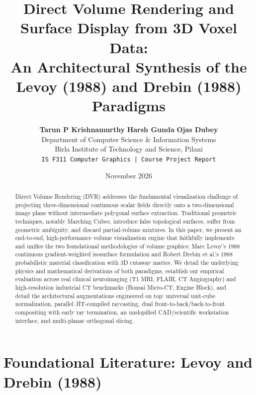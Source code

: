 \documentclass[10pt,twocolumn,a4paper]{article}
\title{\textbf{\Large Direct Volume Rendering and Surface Display from 3D Voxel Data:\\An Architectural Synthesis of the Levoy (1988) and Drebin (1988) Paradigms}}
\author{
    \textbf{Tarun P Krishnamurthy} \quad \textbf{Harsh Gunda} \quad \textbf{Ojas Dubey} \\
    \small Department of Computer Science \& Information Systems \\
    \small Birla Institute of Technology and Science, Pilani \\
    \small \texttt{IS F311 Computer Graphics | Course Project Report}
}
\date{November 2026}
\begin{document}
\maketitle

\begin{abstract}
Direct Volume Rendering (DVR) addresses the fundamental visualization challenge of projecting three-dimensional continuous scalar fields directly onto a two-dimensional image plane without intermediate polygonal surface extraction. Traditional geometric techniques, notably Marching Cubes, introduce false topological surfaces, suffer from geometric ambiguity, and discard partial-volume mixtures. In this paper, we present an end-to-end, high-performance volume visualization engine that faithfully implements and unifies the two foundational methodologies of volume graphics: Marc Levoy's 1988 continuous gradient-weighted isosurface formulation and Robert Drebin et al.'s 1988 probabilistic material classification with 3D cutaway mattes. We detail the underlying physics and mathematical derivations of both paradigms, establish our empirical evaluation across real clinical neuroimaging (T1 MRI, FLAIR, CT Angiography) and high-resolution industrial CT benchmarks (Bonsai Micro-CT, Engine Block), and detail the architectural augmentations engineered on top: universal unit-cube normalization, parallel JIT-compiled raycasting, dual front-to-back/back-to-front compositing with early ray termination, an unslopified CAD/scientific workstation interface, and multi-planar orthogonal slicing.
\end{abstract}

\section{Foundational Literature: Levoy and Drebin (1988)}
\end{document}
